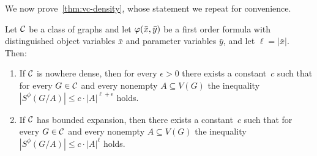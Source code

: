 \medskip
We  now prove~\cref{thm:vc-density}, whose statement we repeat for convenience. 
\setcounter{theorem}{2}
\begin{theorem}
Let $\mathcal{C}$ be a class of graphs and let $\varphi(\bar{x},\bar{y})$ be a first order formula with distinguished object variables $\bar x$ and parameter variables $\bar y$, and let $\ell=|\bar x|$. Then:
\begin{enumerate}[(1)]
\item If $\mathcal{C}$ is nowhere dense, then for every $\epsilon>0$ 
there exists a constant~$c$ such that for every $G\in \mathcal{C}$ and every nonempty
$A\subseteq V(G)$ the inequality $|S^\phi(G/A)|\leq c\cdot |A|^{\ell+\epsilon}$ holds.

\item If $\mathcal{C}$ has bounded expansion, then there exists a constant~$c$ such that for every $G\in \mathcal{C}$ and every nonempty $A\subseteq V(G)$ the inequality $|S^\phi(G/A)|\leq c\cdot |A|^\ell$ holds.
\end{enumerate}
\end{theorem}


